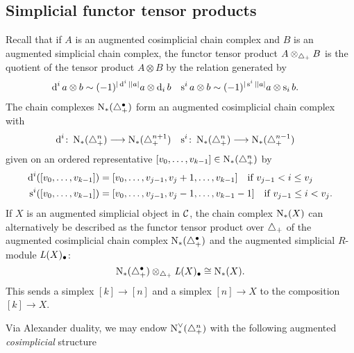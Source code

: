 

\subsection{Simplicial functor tensor products}
Recall that if $A$ is an augmented cosimplicial chain complex and $B$ is an augmented simplicial chain complex, the functor tensor product $A\otimes_{\triangle_{+}} B$ is the quotient of the tensor product $A\otimes B$ by the relation generated by 
\begin{align*}
	\operatorname{d}^i a\otimes b &\sim (-1)^{|\operatorname{d}^i||a|}a\otimes \operatorname{d}_i b
	&
	\operatorname{s}^ia\otimes b &\sim (-1)^{|\operatorname{s}^i||a|}a\otimes \operatorname{s}_ib.
\end{align*}
The chain complexes $\operatorname{N}_{*}(\triangle_{+}^\bullet)$ form an augmented cosimplicial chain complex with
\begin{align*}
	\operatorname{d}^i\colon \operatorname{N}_{*}(\triangle_{+}^n)&\longrightarrow \operatorname{N}_{*}(\triangle_{+}^{n+1})
	&
	\operatorname{s}^i\colon \operatorname{N}_{*}(\triangle_{+}^{n})&\longrightarrow \operatorname{N}_{*}(\triangle_{+}^{n-1})
\end{align*}
given on an ordered representative $[v_0,\ldots,v_{k-1}]\in \operatorname{N}_{*}(\triangle_{+}^n)$ by 
\begin{align*}
\operatorname{d}^i([v_0,\ldots,v_{k-1}]) &= [v_0,\ldots,v_{j-1},v_j+1,\ldots,v_{k-1}] \quad \text{if $v_{j-1}<i\leq v_j$}
\\
\operatorname{s}^i([v_0,\ldots,v_{k-1}]) &= [v_0,\ldots,v_{j-1},v_j-1,\ldots,v_{k-1}-1] \quad \text{if $v_{j-1} \leq i < v_j$}.
\end{align*}
If $X$ is an augmented simplicial object in $\mathcal{C}$, the chain complex $\operatorname{N}_{*}(X)$ can alternatively be described as the functor tensor product over $\triangle_{+}$ of the augmented cosimplicial chain complex $\operatorname{N}_{*}(\triangle_{+}^{\bullet})$ and the augmented simplicial $R$-module $\operatorname{{\it L}}(X)_\bullet$:
\begin{equation}\label{eq:1}
	\operatorname{N}_{*}(\triangle_{+}^\bullet)\otimes_{\triangle_{+}} \operatorname{{\it L}}(X)_\bullet \cong \operatorname{N}_{*}(X).
\end{equation}
This sends a simplex $[k]\to [n]$ and a simplex $[n]\to X$ to the composition $[k]\to X$. 

Via Alexander duality, we may endow $\operatorname{N}^\vee_{*}(\triangle_{+}^n)$ with the following augmented \emph{cosimplicial} structure


